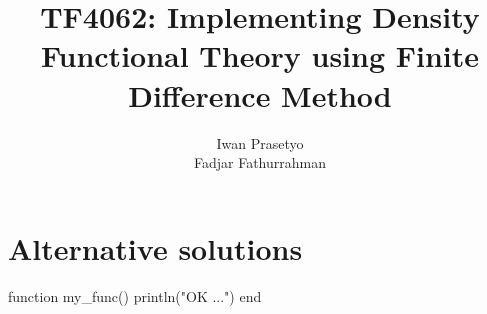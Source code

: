 \documentclass[a4paper]{article}
\begin{document}
\title{TF4062: Implementing Density Functional Theory using Finite Difference Method}
\author{Iwan Prasetyo \\
Fadjar Fathurrahman}
\date{}
\maketitle
















\appendix

\section{Alternative solutions}

\begin{juliacode}
function my_func()
    println("OK ...")
end
\end{juliacode}
\end{document}
